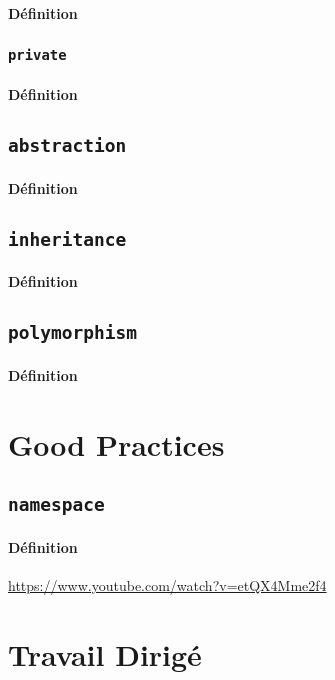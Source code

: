 \documentclass{article}
\begin{document}
\paragraph{Définition}

\subsubsection{\texttt{private}}
\paragraph{Définition}

\subsection{\texttt{abstraction}}
\paragraph{Définition}

\subsection{\texttt{inheritance}}
\paragraph{Définition}

\subsection{\texttt{polymorphism}}
\paragraph{Définition}


\section{Good Practices}
\subsection{\texttt{namespace}}
\paragraph{Définition}\url{https://www.youtube.com/watch?v=etQX4Mme2f4}

\section{Travail Dirigé}
\end{document}
